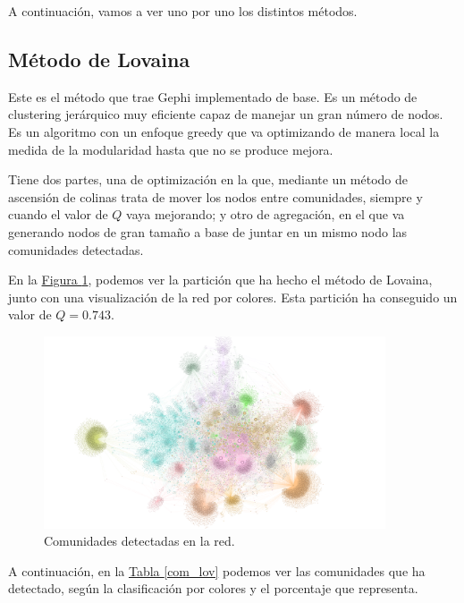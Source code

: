 \documentclass[paper=a4, fontsize=11pt]{article} %
\numberwithin{equation}{section} %
\numberwithin{figure}{section} %
\numberwithin{table}{section} %
\begin{document}
A continuación, vamos a ver uno por uno los distintos métodos.

\subsection{Método de Lovaina}

Este es el método que trae Gephi implementado de base. Es un método de clustering jerárquico muy eficiente capaz de manejar un gran número de nodos. Es un algoritmo con un enfoque greedy que va optimizando de manera local la medida de la modularidad hasta que no se produce mejora.

Tiene dos partes, una de optimización en la que, mediante un método de ascensión de colinas trata de mover los nodos entre comunidades, siempre y cuando el valor de $Q$ vaya mejorando; y otro de agregación, en el que va generando nodos de gran tamaño a base de juntar en un mismo nodo las comunidades detectadas.

En la \hyperref[im7]{Figura \ref*{im7}}, podemos ver la partición que ha hecho el método de Lovaina, junto con una visualización de la red por colores. Esta partición ha conseguido un valor de $Q = 0.743$.

\begin{figure}[H]
  \centering
  \includegraphics[width=0.9\textwidth]{community}
  \caption{Comunidades detectadas en la red.}
  \label{im7}
\end{figure}

A continuación, en la \hyperref[com_lov]{Tabla \ref*{com_lov}} podemos ver las comunidades que ha detectado, según la clasificación por colores y el porcentaje que representa.
\end{document}
